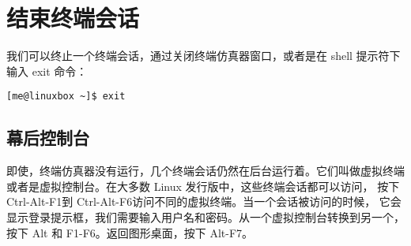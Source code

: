 \section{结束终端会话}

我们可以终止一个终端会话，通过关闭终端仿真器窗口，或者是在 shell 提示符下输入 exit 命令：

\begin{lstlisting}
[me@linuxbox ~]$ exit
\end{lstlisting}

\fboxrule=6pt \fboxsep=4pt
\begin{colorboxed}[boxcolor=lightgray,bgcolor=white]
\subsection{幕后控制台}
即使，终端仿真器没有运行，几个终端会话仍然在后台运行着。它们叫做虚拟终端 或者是虚拟控制台。在大多数 Linux 发行版中，这些终端会话都可以访问， 按下 Ctrl-Alt-F1到 Ctrl-Alt-F6访问不同的虚拟终端。当一个会话被访问的时候， 它会显示登录提示框，我们需要输入用户名和密码。从一个虚拟控制台转换到另一个， 按下 Alt 和 F1-F6。返回图形桌面，按下 Alt-F7。
\end{colorboxed}